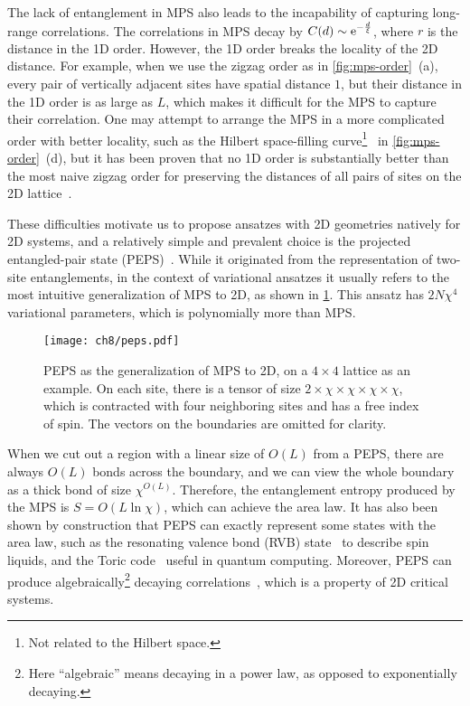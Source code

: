 The lack of entanglement in MPS also leads to the incapability of capturing long-range correlations. The correlations in MPS decay by $C(d) \sim \mathrm{e}^{-\frac{d}{\xi}}$, where $r$ is the distance in the 1D order. However, the 1D order breaks the locality of the 2D distance. For example, when we use the zigzag order as in \cref{fig:mps-order}~(a), every pair of vertically adjacent sites have spatial distance $1$, but their distance in the 1D order is as large as $L$, which makes it difficult for the MPS to capture their correlation. One may attempt to arrange the MPS in a more complicated order with better locality, such as the Hilbert space-filling curve\footnote{Not related to the Hilbert space.}~\cite{hilbert1891uber} in \cref{fig:mps-order}~(d), but it has been proven that no 1D order is substantially better than the most naive zigzag order for preserving the distances of all pairs of sites on the 2D lattice~\cite{xu2012lower}.

These difficulties motivate us to propose ansatzes with 2D geometries natively for 2D systems, and a relatively simple and prevalent choice is the projected entangled-pair state (PEPS)~\cite{verstraete2004renormalization, verstraete2008matrix}. While it originated from the representation of two-site entanglements, in the context of variational ansatzes it usually refers to the most intuitive generalization of MPS to 2D, as shown in \cref{fig:peps}. This ansatz has $2 N \chi^4$ variational parameters, which is polynomially more than MPS.

\begin{figure}[htb]
\centering
\texttt{[image: ch8/peps.pdf]}
\caption[Projected entangled-pair state (PEPS)]{
PEPS as the generalization of MPS to 2D, on a $4 \times 4$ lattice as an example.
On each site, there is a tensor of size $2 \times \chi \times \chi \times \chi \times \chi$, which is contracted with four neighboring sites and has a free index of spin.
The vectors on the boundaries are omitted for clarity.
}
\label{fig:peps}
\end{figure}

When we cut out a region with a linear size of $O(L)$ from a PEPS, there are always $O(L)$ bonds across the boundary, and we can view the whole boundary as a thick bond of size $\chi^{O(L)}$. Therefore, the entanglement entropy produced by the MPS is $S = O(L \ln \chi)$, which can achieve the area law. It has also been shown by construction that PEPS can exactly represent some states with the area law, such as the resonating valence bond (RVB) state~\cite{schuch2012resonating} to describe spin liquids, and the Toric code~\cite{kitaev2003fault, schuch2010peps} useful in quantum computing. Moreover, PEPS can produce algebraically\footnote{Here ``algebraic'' means decaying in a power law, as opposed to exponentially decaying.} decaying correlations~\cite{verstraete2006criticality}, which is a property of 2D critical systems.

